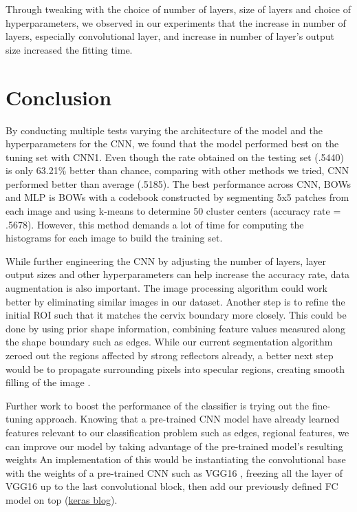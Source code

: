 \documentclass{article}
\begin{document}
Through tweaking with the choice of number of layers, size of layers and
choice of hyperparameters, we observed in our experiments that the increase in number of
layers, especially convolutional layer, and increase in number of
layer's output size increased the fitting time. 

\section{Conclusion}
By conducting multiple tests varying the architecture of the model and the hyperparameters for the CNN, we found that the model performed best on the tuning set with CNN1. Even though the rate obtained on the testing set (.5440) is only 63.21\% better than chance, comparing with other methods we tried, CNN performed better than average (.5185). The best performance across CNN, BOWs and MLP is BOWs with a codebook constructed by segmenting 5x5 patches from each image and using k-means to determine 50 cluster centers (accuracy rate = .5678). However, this method demands a lot of time for computing the histograms for each image to build the training set.

While further engineering the CNN by adjusting the number of layers, layer output sizes and other hyperparameters can help increase the accuracy rate, data augmentation is also important.  The image processing algorithm could work better by eliminating similar images in our dataset.  Another step is to refine the initial ROI such that it matches the cervix boundary more closely.  This could be done by using prior shape information, combining feature values measured along the shape boundary such as edges. While our current segmentation algorithm zeroed out the regions affected by strong reflectors already, a better next step would be to propagate surrounding pixels into specular regions, creating smooth filling of the image \cite{autodetect}.

Further work to boost the performance of the classifier is trying out
the fine-tuning approach. Knowing that a pre-trained CNN model have
already learned features relevant to our classification problem such
as edges, regional features, we can improve our model by taking
advantage of the pre-trained model’s resulting weights An
implementation of this would be instantiating the convolutional base
with the weights of a pre-trained CNN such as VGG16 \cite{vgg16}, freezing all the layer of VGG16 up to the last convolutional block, then add our previously defined FC model on top (\href{https://blog.keras.io/building-powerful-image-classification-models-using-very-little-data.html}{keras blog}).   




\end{document}
